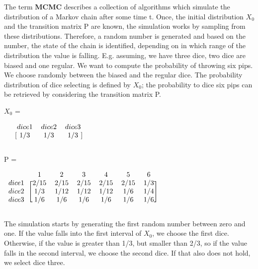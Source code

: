 The term \textbf{\ac{MCMC}} describes a collection of algorithms which simulate the distribution of a Markov chain after some time t. Once, the initial distribution $X_0$ and the transition matrix P are known, the simulation works by sampling from these distributions. Therefore, a random number is generated and based on the number, the state of the chain is identified, depending on in which range of the distribution the value is falling.\newline
E.g. assuming, we have three dice, two dice are biased and one regular. We want to compute the probability of throwing six pips. We choose randomly between the biased and the regular dice. The probability distribution of dice selecting is defined by $X_0$; the probability to dice six pips can be retrieved by considering the transition matrix P.
\begin{center}
\begin{large}
$X_0$ =
\end{large}
$\begin{blockarray}{cccc}
  & dice 1 & dice 2 & dice 3 \\
  \begin{block}{c[ccc]}
    & 1/3 & 1/3 & 1/3 \\
  \end{block}
\end{blockarray}$
\\
\begin{LARGE}
P =
\end{LARGE}
$\begin{blockarray}{ccccccc}
  & 1 & 2 & 3 & 4 & 5 & 6 \\
  \begin{block}{c[cccccc]}
    dice 1 & 2/15 & 2/15 & 2/15 & 2/15 & 2/15 & 1/3 \\
    dice 2 & 1/3 & 1/12 & 1/12 & 1/12 & 1/6 & 1/4 \\
    dice 3 & 1/6 & 1/6 & 1/6 & 1/6 & 1/6 & 1/6 \\
  \end{block}
\end{blockarray}$
\end{center}
The simulation starts by generating the first random number between zero and one. If the value falls into the first interval of $X_0$, we choose the first dice. Otherwise, if the value is greater than 1/3, but smaller than 2/3, so if the value falls in the second interval, we choose the second dice. If that also does not hold, we select dice three.\newline
